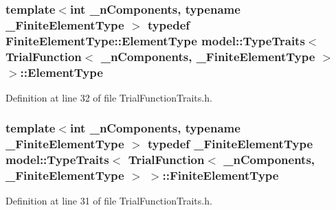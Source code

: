 \subsubsection[{Element\+Type}]{\setlength{\rightskip}{0pt plus 5cm}template$<$int \+\_\+n\+Components, typename \+\_\+\+Finite\+Element\+Type $>$ typedef Finite\+Element\+Type\+::\+Element\+Type {\bf model\+::\+Type\+Traits}$<$ {\bf Trial\+Function}$<$ \+\_\+n\+Components, \+\_\+\+Finite\+Element\+Type $>$ $>$\+::{\bf Element\+Type}}\label{structmodel_1_1_type_traits_3_01_trial_function_3_01__n_components_00_01___finite_element_type_01_4_01_4_a3f394cdc5c638178f7044046520df52b}


Definition at line 32 of file Trial\+Function\+Traits.\+h.

\hypertarget{structmodel_1_1_type_traits_3_01_trial_function_3_01__n_components_00_01___finite_element_type_01_4_01_4_aadf2f168a7d028eb5c9362c701b48a90}{}
\subsubsection[{Finite\+Element\+Type}]{\setlength{\rightskip}{0pt plus 5cm}template$<$int \+\_\+n\+Components, typename \+\_\+\+Finite\+Element\+Type $>$ typedef \+\_\+\+Finite\+Element\+Type {\bf model\+::\+Type\+Traits}$<$ {\bf Trial\+Function}$<$ \+\_\+n\+Components, \+\_\+\+Finite\+Element\+Type $>$ $>$\+::{\bf Finite\+Element\+Type}}\label{structmodel_1_1_type_traits_3_01_trial_function_3_01__n_components_00_01___finite_element_type_01_4_01_4_aadf2f168a7d028eb5c9362c701b48a90}


Definition at line 31 of file Trial\+Function\+Traits.\+h.

\hypertarget{structmodel_1_1_type_traits_3_01_trial_function_3_01__n_components_00_01___finite_element_type_01_4_01_4_aec3259c82f9426309f6e9bd82cc7ed9b}{}
